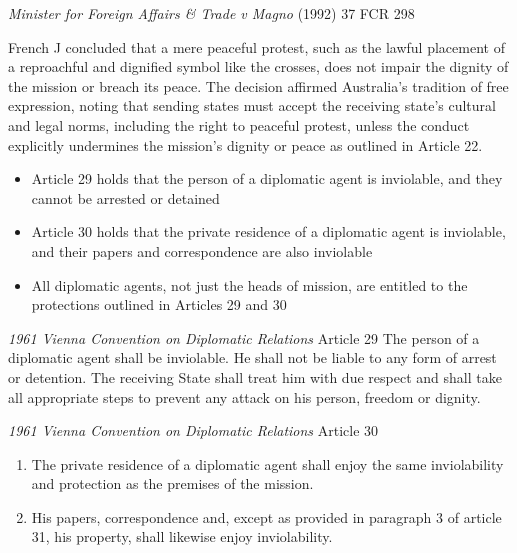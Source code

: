 \begin{casedetails}{\textit{Minister for Foreign Affairs \& Trade v Magno} (1992) 37 FCR 298}
    \vspace{\baselineskip}

    French J concluded that a mere peaceful protest, such as the lawful placement of a reproachful and dignified symbol like the crosses, does not impair the dignity of the mission or breach its peace. The decision affirmed Australia's tradition of free expression, noting that sending states must accept the receiving state's cultural and legal norms, including the right to peaceful protest, unless the conduct explicitly undermines the mission's dignity or peace as outlined in Article 22.
\end{casedetails}

\begin{itemize}
    \item Article 29 holds that the person of a diplomatic agent is inviolable, and they cannot be arrested or detained
    \item Article 30 holds that the private residence of a diplomatic agent is inviolable, and their papers and correspondence are also inviolable
    \item All diplomatic agents, not just the heads of mission, are entitled to the protections outlined in Articles 29 and 30
\end{itemize}

\begin{conventiondetails}{\textit{1961 Vienna Convention on Diplomatic Relations} Article 29}
    \flushleft
    The person of a diplomatic agent shall be inviolable. He shall not be liable to any form of arrest or detention. The receiving State shall treat him with due respect and shall take all appropriate steps to prevent any attack on his person, freedom or dignity.
\end{conventiondetails}

\begin{conventiondetails}{\textit{1961 Vienna Convention on Diplomatic Relations} Article 30}
    \flushleft
    \begin{enumerate}
        \item The private residence of a diplomatic agent shall enjoy the same inviolability and protection as the premises of the mission.
        \item His papers, correspondence and, except as provided in paragraph 3 of article 31, his property, shall likewise enjoy inviolability.
    \end{enumerate}
\end{conventiondetails}

